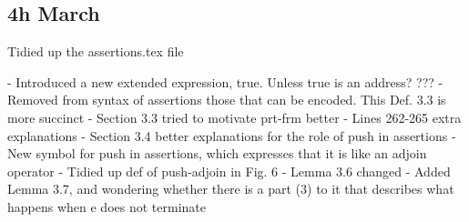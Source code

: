 \documentclass[acmsmall,review,anonymous]{acmart}\settopmatter{printfolios=true}
\begin{document}
\subsection{4h March}

Tidied up the assertions.tex file

- Introduced a new extended expression, true. Unless true is an address? ???
- Removed from syntax of assertions those that can be encoded. This Def. 3.3 is more succinct 
- Section 3.3 tried to motivate prt-frm better 
- Lines 262-265 extra explanations 
- Section 3.4 better explanations for the role of push in assertions 
- New symbol for push in assertions, which expresses that it is like an adjoin operator
- Tidied up def of push-adjoin in Fig. 6
- Lemma 3.6 changed
- Added Lemma 3.7, and wondering whether there is a part (3) to it that describes what happens when e does not terminate 

 
\end{document}
